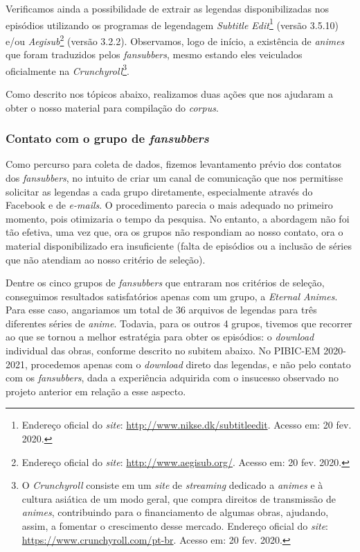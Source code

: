 \documentclass[portuguese]{textolivre}
\begin{document}
Verificamos ainda a possibilidade de extrair as legendas disponibilizadas nos episódios utilizando os programas de legendagem \textit{Subtitle Edit}\footnote{Endereço oficial do \textit{site}: \url{http://www.nikse.dk/subtitleedit}. Acesso em: 20 fev. 2020.} (versão 3.5.10) e/ou \textit{Aegisub}\footnote{Endereço oficial do \textit{site}: \url{http://www.aegisub.org/}. Acesso em: 20 fev. 2020.} (versão 3.2.2). Observamos, logo de início, a existência de \textit{animes} que foram traduzidos pelos \textit{fansubbers}, mesmo estando eles veiculados oficialmente na \textit{Crunchyroll}\footnote{O \textit{Crunchyroll} consiste em um \textit{site} de \textit{streaming} dedicado a \textit{animes} e à cultura asiática de um modo geral, que compra direitos de transmissão de \textit{animes}, contribuindo para o financiamento de algumas obras, ajudando, assim, a fomentar o crescimento desse mercado. Endereço oficial do \textit{site}: \url{https://www.crunchyroll.com/pt-br}. Acesso em: 20 fev. 2020.}. 

Como descrito nos tópicos abaixo, realizamos duas ações que nos ajudaram a obter o nosso material para compilação do \textit{corpus}.

\subsubsection{Contato com o grupo de \textit{fansubbers}}\label{sec-formato}
Como percurso para coleta de dados, fizemos levantamento prévio dos contatos dos \textit{fansubbers}, no intuito de criar um canal de comunicação que nos permitisse solicitar as legendas a cada grupo diretamente, especialmente através do Facebook e de \textit{e-mails}.  O procedimento parecia o mais adequado no primeiro momento, pois otimizaria o tempo da pesquisa. No entanto, a abordagem não foi tão efetiva, uma vez que, ora os grupos não respondiam ao nosso contato, ora o material disponibilizado era insuficiente (falta de episódios ou a inclusão de séries que não atendiam ao nosso critério de seleção). 

 Dentre os cinco grupos de \textit{fansubbers} que entraram nos critérios de seleção, conseguimos resultados satisfatórios apenas com um grupo, a \textit{Eternal Animes}. Para esse caso, angariamos um total de 36 arquivos de legendas para três diferentes séries de \textit{anime}. Todavia, para os outros 4 grupos, tivemos que recorrer ao que se tornou a melhor estratégia para obter os episódios: o \textit{download} individual das obras, conforme descrito no subitem abaixo. No PIBIC-EM 2020-2021, procedemos apenas com o \textit{download} direto das legendas, e não pelo contato com os \textit{fansubbers}, dada a experiência adquirida com o insucesso observado no projeto anterior em relação a esse aspecto.
\end{document}

